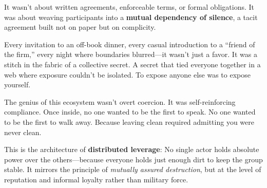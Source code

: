 It wasn’t about written agreements, enforceable terms, or formal obligations. It was about weaving participants into a \textbf{mutual dependency of silence}, a tacit agreement built not on paper but on complicity.

Every invitation to an off-book dinner, every casual introduction to a “friend of the firm,” every night where boundaries blurred—it wasn’t just a favor. It was a stitch in the fabric of a collective secret. A secret that tied everyone together in a web where exposure couldn’t be isolated. To expose anyone else was to expose yourself.

The genius of this ecosystem wasn’t overt coercion. It was self-reinforcing compliance. Once inside, no one wanted to be the first to speak. No one wanted to be the first to walk away. Because leaving clean required admitting you were never clean.

This is the architecture of \textbf{distributed leverage}:  No single actor holds absolute power over the others—because everyone holds just enough dirt to keep the group stable. It mirrors the principle of \emph{mutually assured destruction}, but at the level of reputation and informal loyalty rather than military force.

